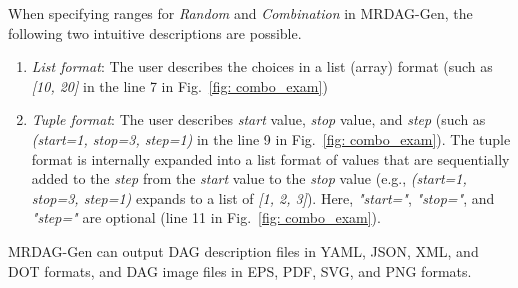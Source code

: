 When specifying ranges for {\it Random} and {\it Combination} in MRDAG-Gen, the following two intuitive descriptions are possible.
\begin{enumerate}
    \item {\it List format}: The user describes the choices in a list (array) format (such as {\it [10, 20]} in the line 7 in Fig.~\ref{fig: combo_exam})
    \item {\it Tuple format}: The user describes {\it start} value, {\it stop} value, and {\it step} (such as {\it (start=1, stop=3, step=1)} in the line 9 in Fig.~\ref{fig: combo_exam}). The tuple format is internally expanded into a list format of values that are sequentially added to the {\it step} from the {\it start} value to the {\it stop} value (e.g., {\it (start=1, stop=3, step=1)} expands to a list of {\it [1, 2, 3]}). Here, {\it "start="}, {\it "stop="}, and {\it "step="} are optional (line 11 in Fig.~\ref{fig: combo_exam}).
\end{enumerate}

MRDAG-Gen can output DAG description files in YAML, JSON, XML, and DOT formats, and DAG image files in EPS, PDF, SVG, and PNG formats.


